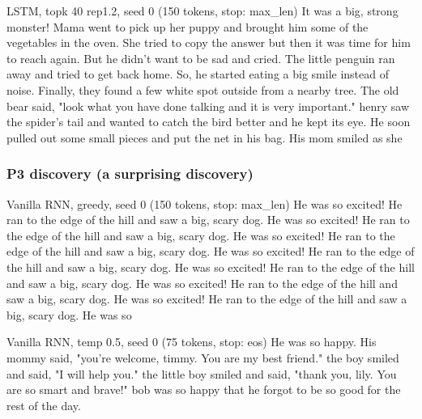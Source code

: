 \begin{modelout}{LSTM, topk 40 rep1.2, seed 0 (150 tokens, stop: max\_len)}
\small It was a big, strong monster! Mama went to pick up her puppy and brought him some of the vegetables in the oven. She tried to copy the answer but then it was time for him to reach again. But he didn't want to be sad and cried. The little penguin ran away and tried to get back home. So, he started eating a big smile instead of noise. Finally, they found a few white spot outside from a nearby tree. The old bear said, "look what you have done talking and it is very important." henry saw the spider's tail and wanted to catch the bird better and he kept its eye. He soon pulled out some small pieces and put the net in his bag. His mom smiled as she
\end{modelout}







\subsubsection*{P3 discovery (a surprising discovery)}

\begin{modelout}{Vanilla RNN, greedy, seed 0 (150 tokens, stop: max\_len)}
\small He was so excited! He ran to the edge of the hill and saw a big, scary dog. He was so excited! He ran to the edge of the hill and saw a big, scary dog. He was so excited! He ran to the edge of the hill and saw a big, scary dog. He was so excited! He ran to the edge of the hill and saw a big, scary dog. He was so excited! He ran to the edge of the hill and saw a big, scary dog. He was so excited! He ran to the edge of the hill and saw a big, scary dog. He was so excited! He ran to the edge of the hill and saw a big, scary dog. He was so
\end{modelout}

\begin{modelout}{Vanilla RNN, temp 0.5, seed 0 (75 tokens, stop: eos)}
\small He was so happy. His mommy said, "you're welcome, timmy. You are my best friend." the boy smiled and said, "I will help you." the little boy smiled and said, "thank you, lily. You are so smart and brave!" bob was so happy that he forgot to be so good for the rest of the day.
\end{modelout}

